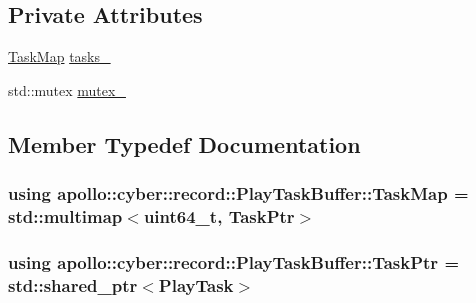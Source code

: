 \subsection*{Private Attributes}
\begin{DoxyCompactItemize}
\item 
\hyperlink{classapollo_1_1cyber_1_1record_1_1PlayTaskBuffer_a86f981e02cc0d763c58afdd89b0db510}{Task\-Map} \hyperlink{classapollo_1_1cyber_1_1record_1_1PlayTaskBuffer_a4d96a5bc32297ceb367780f555d323d8}{tasks\-\_\-}
\item 
std\-::mutex \hyperlink{classapollo_1_1cyber_1_1record_1_1PlayTaskBuffer_a1ffbe36785389d7f80ee266898ab1348}{mutex\-\_\-}
\end{DoxyCompactItemize}


\subsection{Member Typedef Documentation}
\hypertarget{classapollo_1_1cyber_1_1record_1_1PlayTaskBuffer_a86f981e02cc0d763c58afdd89b0db510}{
\subsubsection[{Task\-Map}]{\setlength{\rightskip}{0pt plus 5cm}using {\bf apollo\-::cyber\-::record\-::\-Play\-Task\-Buffer\-::\-Task\-Map} =  std\-::multimap$<$uint64\-\_\-t, {\bf Task\-Ptr}$>$}}\label{classapollo_1_1cyber_1_1record_1_1PlayTaskBuffer_a86f981e02cc0d763c58afdd89b0db510}
\hypertarget{classapollo_1_1cyber_1_1record_1_1PlayTaskBuffer_abdab9410dfa9e3ea1ff24159f2def04f}{
\subsubsection[{Task\-Ptr}]{\setlength{\rightskip}{0pt plus 5cm}using {\bf apollo\-::cyber\-::record\-::\-Play\-Task\-Buffer\-::\-Task\-Ptr} =  std\-::shared\-\_\-ptr$<${\bf Play\-Task}$>$}}\label{classapollo_1_1cyber_1_1record_1_1PlayTaskBuffer_abdab9410dfa9e3ea1ff24159f2def04f}


